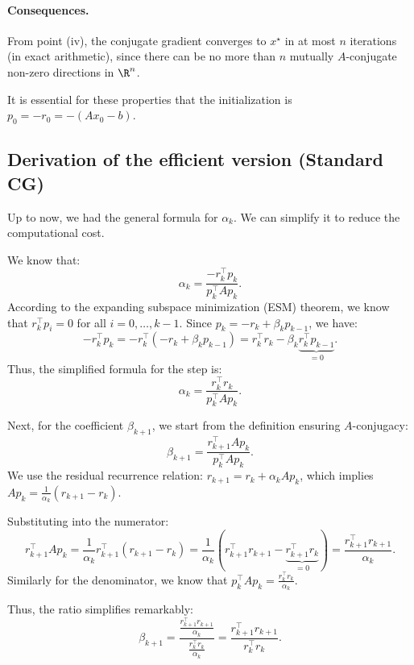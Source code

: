 \paragraph{Consequences.}
From point (iv), the conjugate gradient converges to $x^\star$ in at most $n$ iterations (in exact arithmetic), since there can be no more than $n$ mutually $A$-conjugate non-zero directions in $\R^n$.

\begin{remarque}
It is essential for these properties that the initialization is $p_0 = -r_0 = -(A x_0 - b)$.
\end{remarque}

\subsection{Derivation of the efficient version (Standard CG)}
\label{sec:efficient-cg}

Up to now, we had the general formula for $\alpha_k$. We can simplify it to reduce the computational cost.

We know that:
\[ \alpha_k = \frac{-r_k^\top p_k}{p_k^\top A p_k}. \]
According to the expanding subspace minimization (ESM) theorem, we know that $r_k^\top p_i = 0$ for all $i = 0, \dots, k-1$.
Since $p_k = -r_k + \beta_k p_{k-1}$, we have:
\[ 
-r_k^\top p_k = -r_k^\top (-r_k + \beta_k p_{k-1}) = r_k^\top r_k - \beta_k \underbrace{r_k^\top p_{k-1}}_{=0}.
\]
Thus, the simplified formula for the step is:
\[
\boxed{\alpha_k = \frac{r_k^\top r_k}{p_k^\top A p_k}}.
\]

Next, for the coefficient $\beta_{k+1}$, we start from the definition ensuring $A$-conjugacy:
\[
\beta_{k+1} = \frac{r_{k+1}^\top A p_k}{p_k^\top A p_k}.
\]
We use the residual recurrence relation: $r_{k+1} = r_k + \alpha_k A p_k$, which implies $A p_k = \frac{1}{\alpha_k}(r_{k+1} - r_k)$.

Substituting into the numerator:
\[
r_{k+1}^\top A p_k = \frac{1}{\alpha_k} r_{k+1}^\top (r_{k+1} - r_k) = \frac{1}{\alpha_k} (r_{k+1}^\top r_{k+1} - \underbrace{r_{k+1}^\top r_k}_{=0}) = \frac{r_{k+1}^\top r_{k+1}}{\alpha_k}.
\]
Similarly for the denominator, we know that $p_k^\top A p_k = \frac{r_k^\top r_k}{\alpha_k}$.

Thus, the ratio simplifies remarkably:
\[
\beta_{k+1} = \frac{\frac{r_{k+1}^\top r_{k+1}}{\alpha_k}}{\frac{r_k^\top r_k}{\alpha_k}} = \frac{r_{k+1}^\top r_{k+1}}{r_k^\top r_k}.
\]

